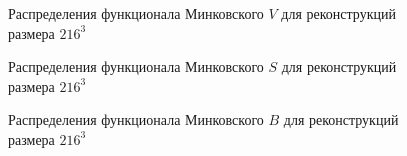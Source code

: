 			\begin{figure}[h]
				\begin{minipage}[h]{0.49\linewidth}
				\end{minipage}
				\hfill
				\begin{minipage}[h]{0.49\linewidth}
				\end{minipage}
				\caption{Распределения функционала Минковского $V$ для реконструкций размера $216^3$}
				\label{5-dist-V-216}
			\end{figure}
			
			\begin{figure}[h]
				\begin{minipage}[h]{0.49\linewidth}
				\end{minipage}
				\hfill
				\begin{minipage}[h]{0.49\linewidth}
				\end{minipage}
				\caption{Распределения функционала Минковского $S$ для реконструкций размера $216^3$}
				\label{5-dist-S-216}
			\end{figure}
			
			\begin{figure}[h]
				\begin{minipage}[h]{0.49\linewidth}
				\end{minipage}
				\hfill
				\begin{minipage}[h]{0.49\linewidth}
				\end{minipage}
				\caption{Распределения функционала Минковского $B$ для реконструкций размера $216^3$}
				\label{5-dist-B-216}
			\end{figure}
			
